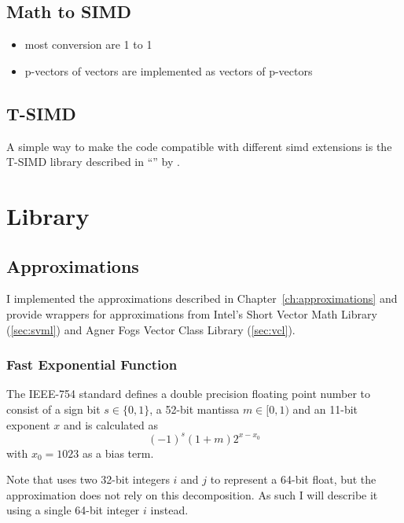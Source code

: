 \documentclass[a4paper, 11pt]{memoir}
\begin{document}
    \subsection{Math to SIMD}
    \begin{itemize}
        \item most conversion are 1 to 1
        \item p-vectors of vectors are implemented as vectors of p-vectors
    \end{itemize}
    \subsection{T-SIMD}
    \label{sec:tsimd}
    A simple way to make the code compatible with different \gls{simd} extensions is the T-SIMD library described in \enquote{} \cite{own_moeller_16_2} by \citeauthor{own_moeller_16_2}.

    \section{Library}
    \label{sec:library}

    \subsection{Approximations}
    I implemented the approximations described in Chapter~\ref{ch:approximations} and provide wrappers for approximations from Intel's Short Vector
    Math Library (\ref{sec:svml}) and Agner Fogs Vector Class Library (\ref{sec:vcl}).

    \subsubsection{Fast Exponential Function}
    \label{sec:impl_fast_exp}
    The IEEE-754 standard defines a double precision floating point number to consist of a sign bit $s \in \{ 0, 1 \}$, a 52-bit mantissa $m \in [0, 1)$ and an
    11-bit exponent $x$ and is calculated as
    \begin{equation}
        (-1)^s (1 + m) 2^{x - x_0}
        \label{eq:def_ieee754}
    \end{equation}
    with $x_0 = 1023$ as a bias term.

    Note that \citeauthor{fast_exp} uses two 32-bit integers $i$ and $j$ to represent a 64-bit float, but the approximation does not rely on this decomposition. As such I will describe it
    using a single 64-bit integer $i$ instead.
\end{document}
